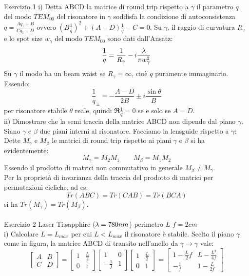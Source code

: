 Esercizio 1
i) Detta ABCD la matrice di round trip rispetto a $\gamma$ il parametro $q$ del modo $TEM_{00}$ del risonatore in $\gamma$ soddisfa la condizione di autoconsistenza $q = \frac{Aq_1 + B}{Cq_1 + D}$ ovvero $\left(B\frac{1}{q}\right)^2 + (A-D)\frac{1}{q} - C = 0$. Su $\gamma$, il raggio di curvatura $R_\gamma$ e lo spot size $w_\gamma$ del modo $TEM_{00}$ sono dati dall'Ansatz:
\begin{equation*}
\frac{1}{q} = \frac{1}{R_\gamma} -i\frac{\lambda}{\pi w_\gamma^2}
\end{equation*}
Su $\gamma$ il modo ha un beam waist se $R_\gamma=\infty$, cioè $q$ puramente immaginario. Essendo:
\begin{equation*}
\frac{1}{q}_\pm = -\frac{A-D}{2B} \pm i\frac{\sin\theta}{B}
\end{equation*}
per risonatore stabile $\theta$ reale, quindi $\Re{\frac{1}{q}}=0$ se e solo se $A=D$.\\
ii) Dimostrare che la semi traccia della matrice ABCD non dipende dal piano $\gamma$.\\
Siano $\gamma$ e $\beta$ due piani interni al risonatore. Facciamo la lensguide rispetto a $\gamma$:
Dette $M_\gamma$ e $M_\beta$ le matrici di round trip rispetto ai piani $\gamma$ e $\beta$ si ha evidentemente:
\begin{equation*}
M_\gamma = M_2M_1 \qquad M_\beta = M_1M_2
\end{equation*}
Essendo il prodotto di matrici non commutativo in generale $M_\beta \neq M_\gamma$.\\
Per la proprietà di invarianza della traccia del prodotto di matrici per permutazioni cicliche, ad es.
\begin{equation*}
Tr(ABC) = Tr(CAB) = Tr(BCA)
\end{equation*}
si ha $Tr(M_\gamma) = Tr(M_\beta)$.\\
\\
Esercizio 2
Laser Ti:sapphire ($\lambda=780nm$)
perimetro $L$
$f = 2cm$\\
i) Calcolare $L=L_{max}$ per cui $L<L_{max}$ il risonatore è stabile.
Scelto il piano $\gamma$ come in figura, la matrice ABCD di transito nell'anello da $\gamma\rightarrow\gamma$ vale:
\begin{equation*}
\begin{bmatrix}
A	&	B\\
C	&	D
\end{bmatrix}
=\begin{bmatrix}
1	&	\frac{L}{2}\\
0	&	1
\end{bmatrix}\begin{bmatrix}
1	&	0\\
-\frac{1}{f}	&	1
\end{bmatrix}\begin{bmatrix}
1	&	\frac{L}{2}\\
0	&	1
\end{bmatrix}=\begin{bmatrix}
1-\frac{L}2f{}	&	L-\frac{L^2}{4f}\\
-\frac{1}{f}	&	1-\frac{L}{2f}
\end{bmatrix}
\end{equation*}
